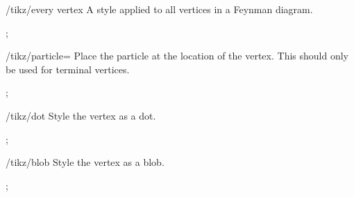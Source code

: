 \documentclass[a4paper,final]{ltxdoc}
\begin{document}
\begin{key}{/tikz/every vertex}
  A style applied to all vertices in a Feynman diagram.

\begin{codeexample}[]
\tikz {};
\end{codeexample}
\end{key}

\begin{key}{/tikz/particle=}
  Place the particle  at the location of the vertex.  This should
  only be used for terminal vertices.

\begin{codeexample}[]
\tikz {};
\end{codeexample}
\end{key}

\begin{key}{/tikz/dot}
  Style the vertex as a dot.

\begin{codeexample}[]
\tikz {};
\end{codeexample}
\end{key}

\begin{key}{/tikz/blob}
  Style the vertex as a blob.

\begin{codeexample}[]
\tikz {};
\end{codeexample}
\end{key}

\printindex
\end{document}
